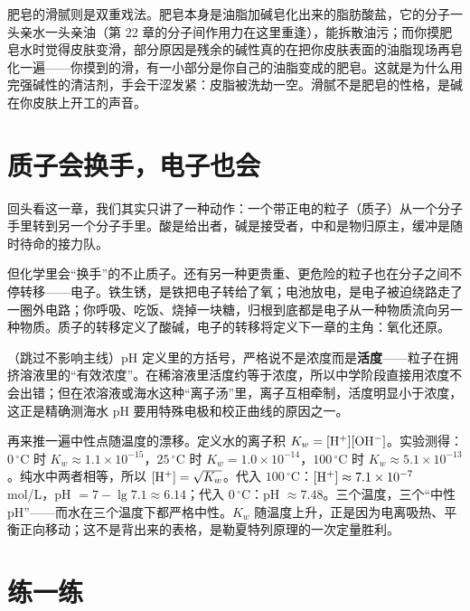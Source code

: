 肥皂的滑腻则是双重戏法。肥皂本身是油脂加碱皂化出来的脂肪酸盐，它的分子一头亲水一头亲油（第 22 章的分子间作用力在这里重逢），能拆散油污；而你摸肥皂水时觉得皮肤变滑，部分原因是残余的碱性真的在把你皮肤表面的油脂现场再皂化一遍——你摸到的滑，有一小部分是你自己的油脂变成的肥皂。这就是为什么用完强碱性的清洁剂，手会干涩发紧：皮脂被洗劫一空。滑腻不是肥皂的性格，是碱在你皮肤上开工的声音。

\section{质子会换手，电子也会}

回头看这一章，我们其实只讲了一种动作：一个带正电的粒子（质子）从一个分子手里转到另一个分子手里。酸是给出者，碱是接受者，中和是物归原主，缓冲是随时待命的接力队。

但化学里会“换手”的不止质子。还有另一种更贵重、更危险的粒子也在分子之间不停转移——电子。铁生锈，是铁把电子转给了氧；电池放电，是电子被迫绕路走了一圈外电路；你呼吸、吃饭、烧掉一块糖，归根到底都是电子从一种物质流向另一种物质。质子的转移定义了酸碱，电子的转移将定义下一章的主角：氧化还原。

\begin{tiaozhan}
（跳过不影响主线）pH 定义里的方括号，严格说不是浓度而是\textbf{活度}——粒子在拥挤溶液里的“有效浓度”。在稀溶液里活度约等于浓度，所以中学阶段直接用浓度不会出错；但在浓溶液或海水这种“离子汤”里，离子互相牵制，活度明显小于浓度，这正是精确测海水 pH 要用特殊电极和校正曲线的原因之一。

再来推一遍中性点随温度的漂移。定义水的离子积 $K_w=[\mathrm{H^+}][\mathrm{OH^-}]$。实验测得：$0\,^{\circ}\mathrm{C}$ 时 $K_w\approx1.1\times10^{-15}$，$25\,^{\circ}\mathrm{C}$ 时 $K_w=1.0\times10^{-14}$，$100\,^{\circ}\mathrm{C}$ 时 $K_w\approx5.1\times10^{-13}$。纯水中两者相等，所以 $[\mathrm{H^+}]=\sqrt{K_w}$。代入 $100\,^{\circ}\mathrm{C}$：$[\mathrm{H^+}]\approx7.1\times10^{-7}$ mol/L，pH $=7-\lg 7.1\approx6.14$；代入 $0\,^{\circ}\mathrm{C}$：pH $\approx7.48$。三个温度，三个“中性 pH”——而水在三个温度下都严格中性。$K_w$ 随温度上升，正是因为电离吸热、平衡正向移动；这不是背出来的表格，是勒夏特列原理的一次定量胜利。
\end{tiaozhan}

\section*{练一练}

